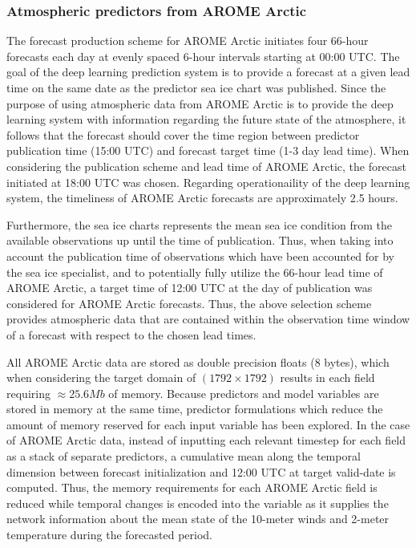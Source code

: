 \documentclass[../main/thesis]{subfiles}
\begin{document}
\subsubsection{Atmospheric predictors from AROME Arctic}
\label{sec:data_arome}
The forecast production scheme for AROME Arctic initiates four 66-hour forecasts each day at evenly spaced 6-hour intervals starting at 00:00 UTC.  The goal of the deep learning prediction system is to provide a forecast at a given lead time on the same date as the predictor sea ice chart was published. Since the purpose of using atmospheric data from AROME Arctic is to provide the deep learning system with information regarding the future state of the atmosphere, it follows that the forecast should cover the time region between predictor publication time (15:00 UTC) and forecast target time (1-3 day lead time). When considering the publication scheme and lead time of AROME Arctic, the forecast initiated at 18:00 UTC was chosen. Regarding operationaility of the deep learning system, the timeliness of AROME Arctic forecasts are approximately 2.5 hours.

Furthermore, the sea ice charts represents the mean sea ice condition from the available observations up until the time of publication. Thus, when taking into account the publication time of observations which have been accounted for by the sea ice specialist, and to potentially fully utilize the 66-hour lead time of AROME Arctic, a target time of 12:00 UTC at the day of publication was considered for AROME Arctic forecasts. Thus, the above selection scheme provides atmospheric data that are contained within the observation time window of a forecast with respect to the chosen lead times.

All AROME Arctic data are stored as double precision floats (8 bytes), which when considering the target domain of $(1792 \times 1792)$ results in each field requiring $\approx 25.6 Mb$ of memory. Because predictors and model variables are stored in memory at the same time, predictor formulations which reduce the amount of memory reserved for each input variable has been explored. In the case of AROME Arctic data, instead of inputting each relevant timestep for each field as a stack of separate predictors, a cumulative mean along the temporal dimension between forecast initialization and 12:00 UTC at target valid-date is computed. Thus, the memory requirements for each AROME Arctic field is reduced while temporal changes is encoded into the variable as it supplies the network information about the mean state of the 10-meter winds and 2-meter temperature during the forecasted period. 
\end{document}
